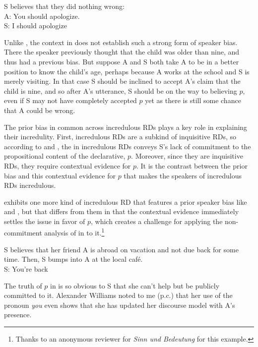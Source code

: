 \documentclass[output=paper,colorlinks,citecolor=brown]{langscibook}
\begin{document}
	\exa S believes that they did nothing wrong:\\
	A: You should apologize.\\
	S: I should apologize\rise  \label{apologize}\hfill \citep[based on][292]{pierrehumbert90}
	\z
	
	Unlike , the context in  does not establish such a strong form of \notp speaker bias. There the speaker previously thought that the child was older than nine, and thus had a previous \notp bias. But suppose A and S both take A to be in a better position to know the child's age, perhaps because A works at the school and S is merely visiting. In that case S should be inclined to accept A's claim that the child is nine, and so after A's utterance, S should be on the way to believing $p$, even if S may not have completely accepted $p$ yet as there is  still some chance that A could be wrong. 
	
	The prior \notp bias in common across incredulous RDs plays a key role in explaining their incredulity. First, incredulous RDs are a subkind of inquisitive RDs, so according to  and , the \rise in incredulous RDs conveys S's lack of commitment to the propositional content of the declarative, $p$. Moreover, since they are inquisitive RDs, they require contextual evidence for $p$. It is the contrast between the prior \notp bias and this contextual evidence for $p$ that makes the speakers of incredulous RDs incredulous.
	
	 exhibits one more kind of incredulous RD that features a prior \notp speaker bias like  and , but that differs from them in that the contextual evidence immediately settles the issue in favor of $p$, which creates a challenge for applying the non-commitment analysis of \rise in  to it.\footnote{Thanks to an anonymous reviewer for \emph{Sinn und Bedeutung} for this example.} 
	
	\exa S believes that her friend A is abroad on vacation and not due back for some time. Then, S bumps into A at the local caf\'e. \\
	S: You're back\rise \label{vaca}
	\z
	
	The truth of $p$ in  is so obvious to S that she can't help but be publicly committed to it. Alexander Williams noted to me (p.c.) that her use of the pronoun \emph{you} even shows that she has updated her discourse model with A's presence. 
	
\end{document}
